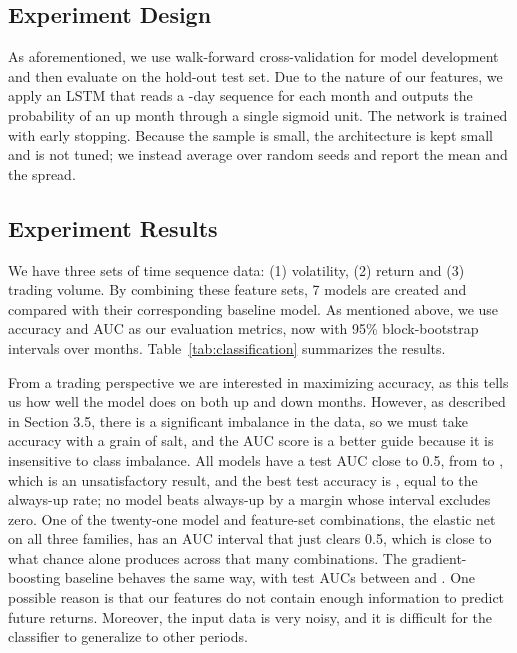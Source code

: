 \documentclass[10pt]{article}
\begin{document}
\subsection{Experiment Design}

As aforementioned, we use walk-forward cross-validation for model development and
then evaluate on the hold-out test set. Due to the nature of our features, we apply
an LSTM that reads a \lookback{}-day sequence for each month and outputs the
probability of an up month through a single sigmoid unit. The network is trained
with early stopping. Because the sample is small, the architecture is kept small
and is not tuned; we instead average over \nSeeds{} random seeds and report the
mean and the spread.

\subsection{Experiment Results}

We have three sets of time sequence data: (1) volatility, (2) return and (3)
trading volume. By combining these feature sets, 7 models are created and compared
with their corresponding baseline model. As mentioned above, we use accuracy and
AUC as our evaluation metrics, now with 95\% block-bootstrap intervals over months.
Table~\ref{tab:classification} summarizes the results.

\begin{table}[t]
  \centering
  \small
  \caption{Summary of model results. The baseline is the elastic-net logistic
  regression; accuracy cells show development / test accuracy. The test set has
  \nTest{} months with an up rate of \testUp{}.}
  \label{tab:classification}
  
\end{table}

From a trading perspective we are interested in maximizing accuracy, as this tells
us how well the model does on both up and down months. However, as described in
Section 3.5, there is a significant imbalance in the data, so we must take accuracy
with a grain of salt, and the AUC score is a better guide because it is insensitive
to class imbalance. All models have a test AUC close to 0.5, from \minAUC{} to
\maxAUC{}, which is an unsatisfactory result, and the best test accuracy is
\maxAcc{}, equal to the always-up rate; no model beats always-up by a margin whose
interval excludes zero. One of the twenty-one model and feature-set combinations,
the elastic net on all three families, has an AUC interval that just clears 0.5,
which is close to what chance alone produces across that many combinations. The
gradient-boosting baseline behaves the same way, with test AUCs between \gbMinAUC{}
and \gbMaxAUC{}. One possible reason is that our features do not contain enough
information to predict future returns. Moreover, the input data is very noisy, and
it is difficult for the classifier to generalize to other periods.
\end{document}

